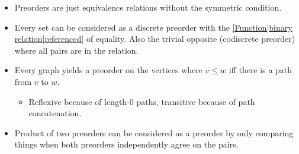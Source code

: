 \begin{itemize}
    \item Preorders are just equivalence relations without the symmetric condition.
    \item Every set can be considered as a discrete preorder with the \ref{Function|binary relation|referenced} of equality. Also the trivial opposite (codiscrete preorder) where all pairs are in the relation.
    \item Every graph yields a preorder on the vertices where $v \leq w$ iff there is a path from $v$ to $w$.
          \begin{itemize}
            \item Reflexive because of length-0 paths, transitive because of path concatenation.
          \end{itemize}
    \item Product of two preorders can be considered as a preorder by only comparing things when both preorders independently agree on the pairs.
  \end{itemize}